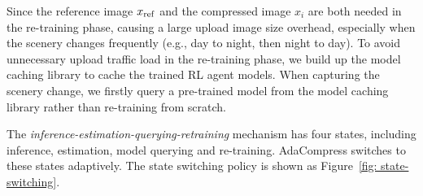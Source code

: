 Since the reference image $ x_{\rm ref} $ and the compressed image $ x_i $ are both needed in the re-training phase, causing a large upload image size overhead, especially when the scenery changes frequently (e.g., day to night, then night to day). To avoid unnecessary upload traffic load in the re-training phase, we build up the model caching library to cache the trained RL agent models. When capturing the scenery change, we firstly query a pre-trained model from the model caching library rather than re-training from scratch. %

The \emph{inference-estimation-querying-retraining} mechanism has four states, including inference, estimation, model querying and re-training. AdaCompress switches to these states adaptively. The state switching policy is shown as Figure~\ref{fig: state-switching}.
%    
%    
